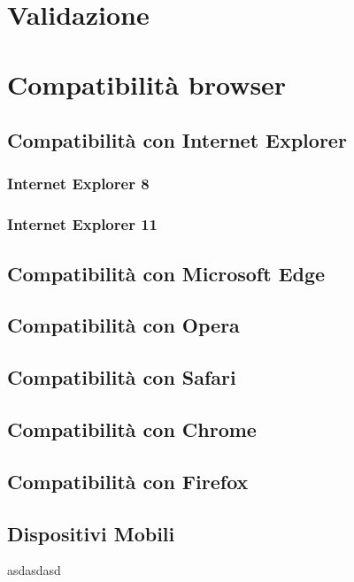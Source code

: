 \documentclass[10pt, a4paper]{article}
\begin{document}
\section{Validazione}
\section{Compatibilità browser}
\subsection{Compatibilità con Internet Explorer}
\subsubsection{Internet Explorer 8}
\subsubsection{Internet Explorer 11}
\subsection{Compatibilità con Microsoft Edge}
\subsection{Compatibilità con Opera}
\subsection{Compatibilità con Safari}
\subsection{Compatibilità con Chrome}
\subsection{Compatibilità con Firefox}
\subsection{Dispositivi Mobili}
asdasdasd
\end{document}
